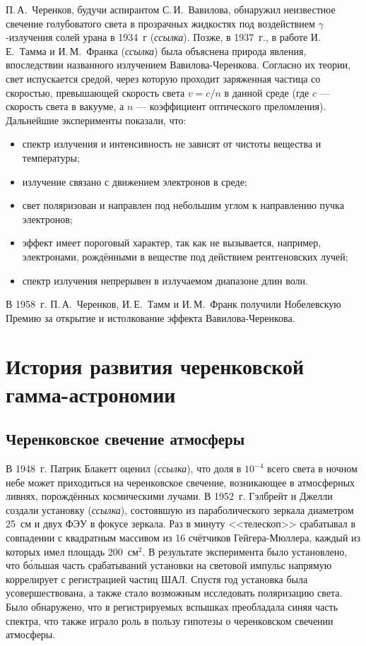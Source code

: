 \documentclass[magd,floatypics,numeref]{msudipl} %
\begin{document}
П.\,А.~Черенков, будучи аспирантом С.\,И.~Вавилова, обнаружил неизвестное свечение голубоватого света в прозрачных жидкостях под воздействием $\gamma$-излучения солей урана в 1934~г (\textit{ссылка}). Позже, в 1937~г., в работе И.\,Е.~Тамма и И.\,М.~Франка (\textit{ссылка}) была объяснена природа явления, впоследствии названного излучением Вавилова-Черенкова. Согласно их теории, свет испускается средой, через которую проходит заряженная частица со скоростью, превышающей скорость света $v=c/n$ в данной среде (где $c$ — скорость света в вакууме, а $n$ --- коэффициент оптического преломления). 
Дальнейшие эксперименты показали, что:
\begin{itemize}
\item спектр излучения и интенсивность не зависят от чистоты вещества и
температуры;
\item излучение связано с движением электронов в среде;
\item свет поляризован и направлен под небольшим углом к направлению
пучка электронов;
\item эффект имеет пороговый характер, так как не вызывается, например,
электронами, рождёнными в веществе под действием рентгеновских
лучей;
\item спектр излучения непрерывен в излучаемом диапазоне длин волн.
\end{itemize}
В 1958~г. П.\,А.~Черенков, И.\,Е.~Тамм и И.\,М.~Франк получили Нобелевскую Премию за открытие и истолкование эффекта Вавилова-Черенкова.

\section{История развития черенковской гамма-астрономии}
\subsection{Черенковское свечение атмосферы}
В 1948~г. Патрик Блакетт оценил (\textit{ссылка}), что доля в $10^{-4}$ всего света в ночном небе может приходиться на черенковское свечение, возникающее в атмосферных ливнях, порождённых космическими лучами. В 1952~г. Гэлбрейт и Джелли создали установку (\textit{ссылка}), состоявшую из параболического зеркала диаметром 25~см и двух ФЭУ в фокусе зеркала. Раз в минуту <<телескоп>> срабатывал в совпадении с квадратным массивом из 16 счётчиков Гейгера-Мюллера, каждый из которых имел площадь 200~$\text{см}^2$. В результате эксперимента было установлено, что б\'ольшая часть срабатываний установки на световой импульс напрямую коррелирует с регистрацией частиц ШАЛ. Спустя год установка была усовершествована, а также стало возможным исследовать поляризацию света. Было обнаружено, что в регистрируемых вспышках преобладала синяя часть спектра, что также играло роль в пользу гипотезы о черенковском свечении атмосферы.  
\end{document}
